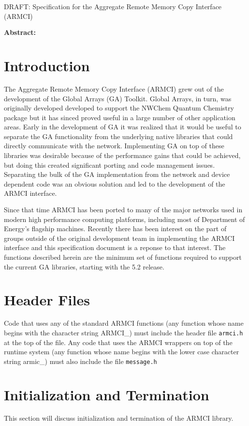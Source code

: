 \documentclass[12pt]{article}
\begin{document}
\begin{titlepage}
\begin{center}
{\LARGE DRAFT: Specification for the Aggregate Remote Memory Copy Interface (ARMCI)}
\end{center}
\bf{Abstract:}
\end{titlepage}
\tableofcontents
\newpage
\pagestyle{plain}
\section{Introduction}
The Aggregate Remote Memory Copy Interface (ARMCI) grew out of the development
of the Global Arrays (GA) Toolkit. Global Arrays, in turn, was originally developed
developed to support the NWChem Quantum Chemistry package but it has sinced
proved useful in a large number of other application areas. Early in the
development of GA it was realized that it would be useful to separate the GA
functionality from the underlying native libraries that could directly
communicate with the network. Implementing GA on top of these libraries was
desirable because of the performance gains that could be achieved, but doing
this created significant porting and code management issues. Separating the bulk
of the GA implementation from the network and device dependent code was an
obvious solution and led to the development of the ARMCI interface.

Since that time ARMCI has been ported to many of the major networks used in modern
high performance computing platforms, including most of Department of Energy's
flagship machines. Recently there has been interest on the part of groups
outside of the original development team in implementing the ARMCI interface and
this specification document is a reponse to that interest. The functions
described herein are the minimum set of functions required to support the
current GA libraries, starting with the 5.2 release.
\section{Header Files}
Code that uses any of the standard ARMCI functions (any function whose name
begins with the character string ARMCI\_) must include the header file
\texttt{armci.h} at the top of the file. Any code that uses the ARMCI wrappers
on top of the runtime system (any function whose name begins with the lower case
character string armic\_) must also include the file \texttt{message.h}
\section{Initialization and Termination}
This section will discuss initialization and termination of the ARMCI library.
\end{document}
